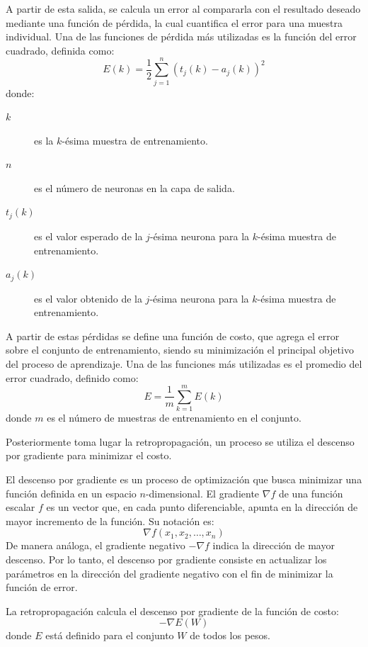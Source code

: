 A partir de esta salida, se calcula un error al compararla con el resultado deseado
mediante una función de pérdida, la cual cuantifica el error para una muestra
individual. Una de las funciones de pérdida más utilizadas es la función del error cuadrado,
definida como:
\begin{equation}
    E(k)=\frac{1}{2}\sum_{j=1}^{n}(t_{j}(k)-a_{j}(k))^{2}
\end{equation}
donde:
\begin{description}
    \item[$k$] es la $k$-ésima muestra de entrenamiento.
    \item[$n$] es el número de neuronas en la capa de salida.
    \item[$t_{j}(k)$] es el valor esperado de la $j$-ésima neurona para la $k$-ésima
    muestra de entrenamiento.
    \item[$a_{j}(k)$] es el valor obtenido de la $j$-ésima neurona para la $k$-ésima
    muestra de entrenamiento.
\end{description}

A partir de estas pérdidas se define una función de costo, que agrega
el error sobre el conjunto de entrenamiento, siendo su minimización el principal
objetivo del proceso de aprendizaje. Una de las funciones más utilizadas es el
promedio del error cuadrado, definido como:
\begin{equation}
    E = \frac{1}{m}\sum_{k=1}^{m}E(k)
\end{equation}
donde $m$ es el número de muestras de entrenamiento en el conjunto.
\medskip

Posteriormente toma lugar la retropropagación, un proceso se utiliza el descenso por 
gradiente para minimizar el costo.
\medskip

El descenso por gradiente es un proceso de optimización que busca minimizar una función 
definida en un espacio $n$-dimensional.
El gradiente $\nabla f$ de una función escalar $f$ es un vector que, en cada punto
diferenciable, apunta en la dirección de mayor incremento de la función. Su notación es:
\begin{equation}
    \nabla f(x_{1},x_{2},\dots,x_{n})
\end{equation}
De manera análoga, el gradiente negativo $-\nabla f$ indica la dirección de mayor
descenso. Por lo tanto, el descenso por gradiente consiste en actualizar los parámetros
en la dirección del gradiente negativo con el fin de minimizar la función de error.
\medskip

La retropropagación calcula el descenso por gradiente de la función de costo:
\begin{equation}
    -\nabla E(W)
\end{equation}
donde $E$ está definido para el conjunto $W$ de todos los pesos.

